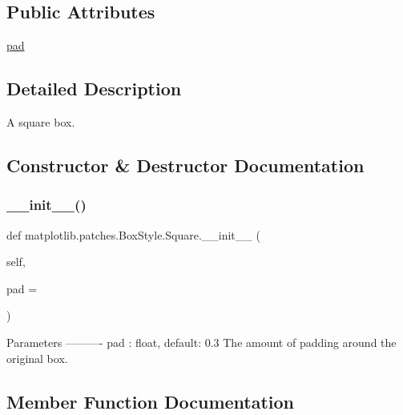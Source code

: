 \subsection*{Public Attributes}
\begin{DoxyCompactItemize}
\item 
\hyperlink{classmatplotlib_1_1patches_1_1BoxStyle_1_1Square_a4a36206a4868c89251482d499c23b483}{pad}
\end{DoxyCompactItemize}


\subsection{Detailed Description}
\begin{DoxyVerb}A square box.\end{DoxyVerb}
 

\subsection{Constructor \& Destructor Documentation}
\mbox{\label{classmatplotlib_1_1patches_1_1BoxStyle_1_1Square_a075e60ee3f21011554551e08a78ebff2}} 
\subsubsection{\texorpdfstring{\+\_\+\+\_\+init\+\_\+\+\_\+()}{\_\_init\_\_()}}
{\footnotesize\ttfamily def matplotlib.\+patches.\+Box\+Style.\+Square.\+\_\+\+\_\+init\+\_\+\+\_\+ (\begin{DoxyParamCaption}\item[{}]{self,  }\item[{}]{pad = {} }\end{DoxyParamCaption})}

\begin{DoxyVerb}Parameters
----------
pad : float, default: 0.3
    The amount of padding around the original box.
\end{DoxyVerb}
 

\subsection{Member Function Documentation}
\mbox{\label{classmatplotlib_1_1patches_1_1BoxStyle_1_1Square_ad623c3121543c7610233b6d8d35c9806}} 
